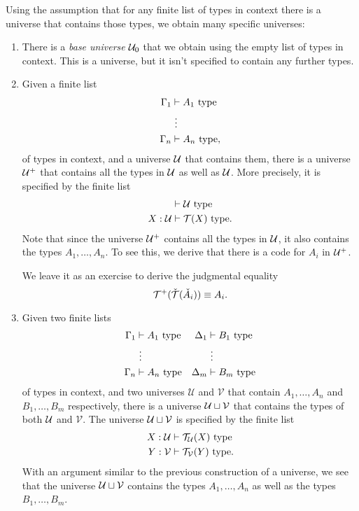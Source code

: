\begin{rmk}\label{rmk:universe-constructions}
  Using the assumption that for any finite list of types in context there is a universe that contains those types, we obtain many specific universes:
  \begin{enumerate}
  \item There is a \emph{base universe} $\UU_0$ that we obtain using the empty list of types in context. This is a universe, but it isn't specified to contain any further types.
  \item Given a finite list
    \begin{align*}
      \Gamma_1 & \vdash A_1~\type \\
      & ~\vdots \\
      \Gamma_n & \vdash A_n~\type,
    \end{align*}
    of types in context, and a universe $\UU$ that contains them, there is a universe $\UU^+$ that contains all the types in $\UU$ as well as $\UU$. More precisely, it is specified by the finite list
    \begin{align*}
      & \vdash \UU~\type \\
      X:\UU & \vdash \mathcal{T}(X)~\type.
    \end{align*}
    Note that since the universe $\UU^+$ contains all the types in $\UU$, it also contains the types $A_1,\ldots,A_n$. To see this, we derive that there is a code for $A_i$ in $\UU^+$.
    \begin{prooftree}
    \end{prooftree}
    We leave it as an exercise to derive the judgmental equality
    \begin{equation*}
      \mathcal{T}^+(\check{\mathcal{T}}(\check{A}_i))\jdeq A_i.
    \end{equation*}
  \item Given two finite lists
    \begin{align*}
      \Gamma_1 & \vdash A_1~\type & \Delta_1 & \vdash B_1~\type \\
      & ~\vdots & & ~\vdots \\
      \Gamma_n & \vdash A_n~\type & \Delta_m & \vdash B_m~\type
    \end{align*}
    of types in context, and two universes $\mathcal{U}$ and $\mathcal{V}$ that contain $A_1,\ldots,A_n$ and $B_1,\ldots,B_m$ respectively, there is a universe $\UU\sqcup\mathcal{V}$ that contains the types of both $\UU$ and $\mathcal{V}$. The universe $\UU\sqcup\mathcal{V}$ is specified by the finite list
    \begin{align*}
      X:\UU & \vdash \mathcal{T}_{\mathcal{U}}(X)~\type \\
      Y:\mathcal{V} & \vdash \mathcal{T}_{\mathcal{V}}(Y) ~\type.
    \end{align*}
    With an argument similar to the previous construction of a universe, we see that the universe $\UU\sqcup\mathcal{V}$ contains the types $A_1,\ldots,A_n$ as well as the types $B_1,\ldots,B_m$.


\end{enumerate}
\end{rmk}
